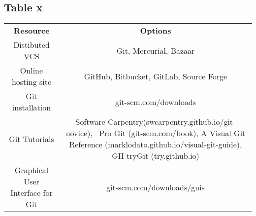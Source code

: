 \subsection{Table x}

\begin{tabular}{ c c }
    \textbf{Resource} & \textbf{Options} \\ 
    Distibuted VCS & Git, Mercurial, Bazaar \\ 
    Online hosting site & GitHub, Bitbucket, GitLab, Source Forge \\ 
    Git installation & git-scm.com/downloads \\ 
    Git Tutorials & Software Carpentry(swcarpentry.github.io/git-novice),  Pro Git (git-scm.com/book), A Visual Git Reference (marklodato.github.io/visual-git-guide), GH tryGit (try.github.io) \\ 
    Graphical User Interface for Git & git-scm.com/downloads/guis \\ 
\end{tabular}